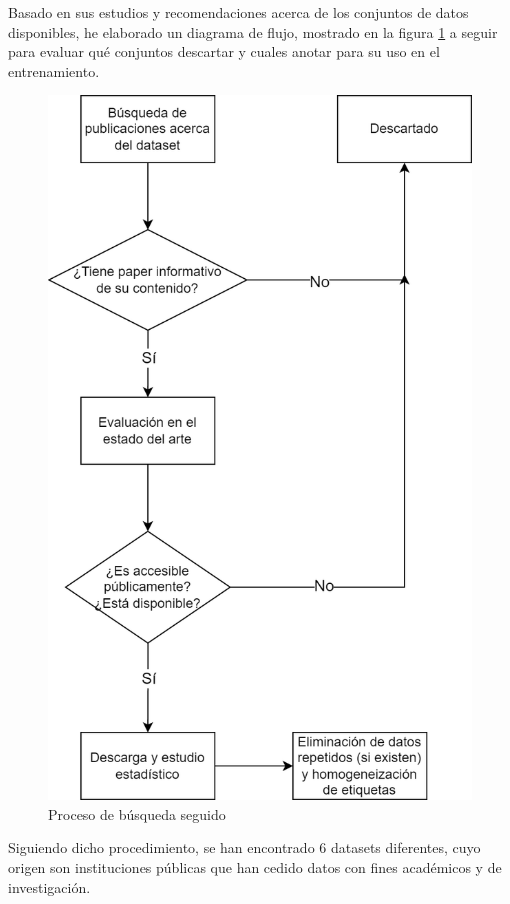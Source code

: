 Basado en sus estudios y recomendaciones acerca de los conjuntos de datos disponibles, he elaborado un diagrama de flujo, mostrado en la figura \ref{fig:diagdatasets} a seguir para evaluar qué conjuntos descartar y cuales anotar para su uso en el entrenamiento.

\begin{figure}[H]
	\centering
	\includegraphics[scale=0.7]{imagenes/DiagramaBusqueda.png}
	\caption{Proceso de búsqueda seguido}
	\label{fig:diagdatasets}
\end{figure}

Siguiendo dicho procedimiento, se han encontrado 6 datasets diferentes, cuyo origen son instituciones públicas que han cedido datos con fines académicos y de investigación.\\

